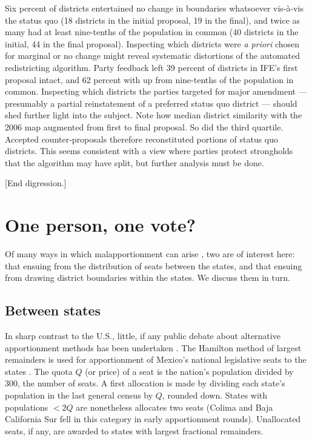 \documentclass[letter,12pt]{article}
\begin{document}
Six percent of districts entertained no change in boundaries whatsoever vis-\`a-vis the status quo (18 districts in the initial proposal, 19 in the final), and twice as many had at least nine-tenths of the population in common (40 districts in the initial, 44 in the final proposal). Inspecting which districts were \emph{a priori} chosen for marginal or no change might reveal systematic distortions of the automated redistricting algorithm. Party feedback left 39 percent of districts in IFE's first proposal intact, and 62 percent with up from nine-tenths of the population in common. Inspecting which districts the parties targeted for major amendment --- presumably a partial reinstatement of a preferred status quo district --- should shed further light into the subject. Note how median district similarity with the 2006 map augmented from first to final proposal. So did the third quartile. Accepted counter-proposals therefore reconstituted portions of status quo districts. This seems consistent with a view where parties protect strongholds that the algorithm may have split, but further analysis must be done. 

[End digression.]

\section{One person, one vote?}

Of many ways in which malapportionment can arise \citep{snyder.samuelsMalapp2004}, two are of interest here: that ensuing from the distribution of seats between the states, and that ensuing from drawing district boundaries within the states. We discuss them in turn.

\subsection{Between states}

In sharp contrast to the U.S., little, if any public debate about alternative apportionment methods has been undertaken \citep{szpiro.numbersRule.2010,balinski.rodriguez.1996}. The Hamilton method of largest remainders is used for apportionment of Mexico's national legislative seats to the states \citep[][:10]{balinskiYoung2001FairRep}. The quota $Q$ (or price) of a seat is the nation's population divided by 300, the number of seats. A first allocation is made by dividing each state's population in the last general census by $Q$, rounded down. States with populations $<2Q$ are nonetheless allocates two seats (Colima and Baja California Sur fell in this category in early apportionment rounds). Unallocated seats, if any, are awarded to states with largest fractional remainders. 
\end{document}
